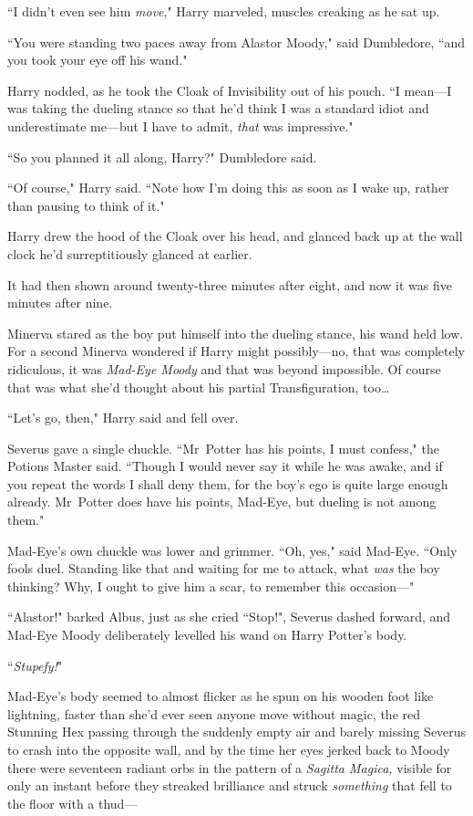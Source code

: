 ``I didn't even see him \emph{move}," Harry marveled, muscles creaking as he sat up.

``You were standing two paces away from Alastor Moody," said Dumbledore, ``and you took your eye off his wand."

Harry nodded, as he took the Cloak of Invisibility out of his pouch. ``I mean—I was taking the dueling stance so that he'd think I was a standard idiot and underestimate me—but I have to admit, \emph{that} was impressive."

``So you planned it all along, Harry?" Dumbledore said.

``Of course," Harry said. ``Note how I'm doing this as soon as I wake up, rather than pausing to think of it."

Harry drew the hood of the Cloak over his head, and glanced back up at the wall clock he'd surreptitiously glanced at earlier.

It had then shown around twenty-three minutes after eight, and now it was five minutes after nine.

\later

Minerva stared as the boy put himself into the dueling stance, his wand held low. For a second Minerva wondered if Harry might possibly—no, that was completely ridiculous, it was \emph{Mad-Eye Moody} and that was beyond impossible. Of course that was what she'd thought about his partial Transfiguration, too{\ldots}

``Let's go, then," Harry said and fell over.

Severus gave a single chuckle. ``Mr~Potter has his points, I must confess," the Potions Master said. ``Though I would never say it while he was awake, and if you repeat the words I shall deny them, for the boy's ego is quite large enough already. Mr~Potter does have his points, Mad-Eye, but dueling is not among them."

Mad-Eye's own chuckle was lower and grimmer. ``Oh, yes," said Mad-Eye. ``Only fools duel. Standing like that and waiting for me to attack, what \emph{was} the boy thinking? Why, I ought to give him a scar, to remember this occasion—"

``Alastor!" barked Albus, just as she cried ``Stop!", Severus dashed forward, and Mad-Eye Moody deliberately levelled his wand on Harry Potter's body.

``\emph{Stupefy!}"

Mad-Eye's body seemed to almost flicker as he spun on his wooden foot like lightning, faster than she'd ever seen anyone move without magic, the red Stunning Hex passing through the suddenly empty air and barely missing Severus to crash into the opposite wall, and by the time her eyes jerked back to Moody there were seventeen radiant orbs in the pattern of a \emph{Sagitta Magica,} visible for only an instant before they streaked brilliance and struck \emph{something} that fell to the floor with a thud—

